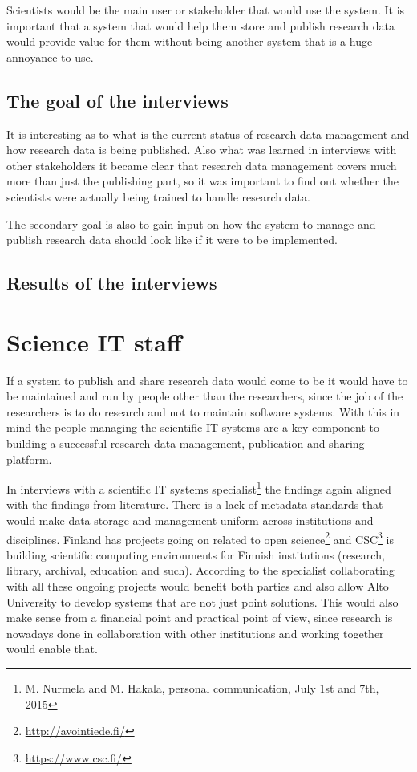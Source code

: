 Scientists would be the main user or stakeholder that would use the system. It
is important that a system that would help them store and publish research data
would provide value for them without being another system that is a huge
annoyance to use.

\subsection{The goal of the interviews}

It is interesting as to what is the current status of research data management
and how research data is being published. Also what was learned in interviews 
with other stakeholders it became clear that research data management covers
much more than just the publishing part, so it was important to find out
whether the scientists were actually being trained to handle research data.

The secondary goal is also to gain input on how the system to manage and
publish research data should look like if it were to be implemented.

\subsection{Results of the interviews}

\fi

\section{Science IT staff}
\label{sec:sci_it}

If a system to publish and share research data would come to be it would have
to be maintained and run by people other than the researchers, since the job of
the researchers is to do research and not to maintain software systems. With this
in mind the people managing the scientific IT systems are a key component to
building a successful research data management, publication and sharing
platform.

In interviews with a scientific IT systems specialist\footnote{M. Nurmela and
M. Hakala, personal communication, July 1st and 7th, 2015} the findings again
aligned with the findings from literature. There is a lack of metadata
standards that would make data storage and management uniform across
institutions and disciplines. Finland has projects going on related to open
science\footnote{\url{http://avointiede.fi/}} and CSC\footnote{\url{https://www.csc.fi/}} is
building scientific computing environments for Finnish institutions (research,
library, archival, education and such). According to the specialist
collaborating with all these ongoing projects would benefit both parties and
also allow Alto University to develop systems that are not just point
solutions. This would also make sense from a financial point and practical
point of view, since research is nowadays done in collaboration with other
institutions and working together would enable that.

